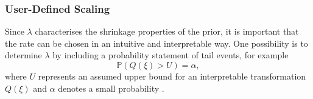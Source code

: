 \subsubsection*{User-Defined Scaling}
Since $\lambda$ characterises the shrinkage properties of the prior, it is important that the rate can be chosen in an intuitive and interpretable way. One possibility is to determine $\lambda$ by including a probability statement of tail events, for example
\begin{equation}\label{eq:pcprior}
    \mathbb{P}\left(Q\left(\xi\right) > U\right)=\alpha,
\end{equation}
where $U$ represents an assumed upper bound for an interpretable transformation $Q\left(\xi\right)$ and $\alpha$ denotes a small probability \autocite[][]{martins2014penalising}.
